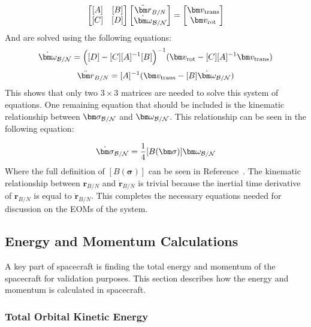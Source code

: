 \begin{equation}
\begin{bmatrix}
[A] & [B]\\
[C] & [D]
\end{bmatrix} \begin{bmatrix}
\ddot{\bm r}_{B/N}\\
\dot{\bm\omega}_{\cal B/N}
\end{bmatrix} = \begin{bmatrix}
\bm v_{\text{trans}}\\
\bm v_{\text{rot}}
\end{bmatrix}
\label{eq:backSub}
\end{equation}
And are solved using the following equations:
\begin{equation}
\dot{\bm\omega}_{\cal B/N} = \Big([D] - [C][A]^{-1}[B]\Big)^{-1}(\bm v_{\text{rot}} - [C][A]^{-1}\bm v_{\text{trans}})
\end{equation}
\begin{equation}
\ddot{\bm r}_{B/N} = [A]^{-1} (\bm v_{\text{trans}} - [B]\dot{\bm\omega}_{\cal B/N})
\end{equation}
This shows that only two $3\times 3$ matrices are needed to solve this system of equations. One remaining equation that should be included is the kinematic relationship between $\bm \sigma_{\cal{B}/\cal{N}}$ and $\bm \omega_{\cal{B}/\cal{N}}$. This relationship can be seen in the following equation:

\begin{equation}
\dot{\bm \sigma}_{\cal{B}/\cal{N}} = \frac{1}{4} [B(\bm \sigma)]\bm \omega_{\cal{B}/\cal{N}}
\end{equation}
Where the full definition of $[B(\bm \sigma)]$ can be seen in Reference~\cite{schaub}. The kinematic relationship between $\bm r_{B/N}$ and $\dot{\bm r}_{B/N}$ is trivial because the inertial time derivative of $\bm r_{B/N}$ is equal to $\dot{\bm r}_{B/N}$. This completes the necessary equations needed for discussion on the EOMs of the system.

\subsection{Energy and Momentum Calculations}

A key part of spacecraft is finding the total energy and momentum of the spacecraft for validation purposes. This section describes how the energy and momentum is calculated in spacecraft.

\subsubsection{Total Orbital Kinetic Energy}

